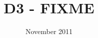 


\title{D3 - FIXME}
\date{November 2011}

 

%

\maketitle

\thispagestyle{empty}
\tableofcontents
\thispagestyle{empty}
\listoffigures
\listoftables
\newpage



%
%
%
%
% 
%


{\small}

